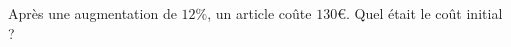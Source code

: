 
\begin{exercice}\label{exosmath-0036}

    Après une augmentation de \( 12\%\), un article coûte \( 130\)€. Quel était le coût initial ?

\end{exercice}
